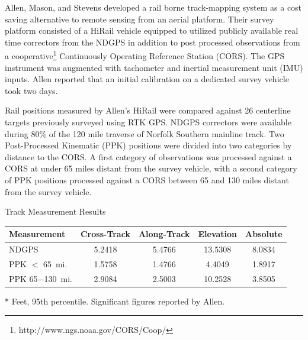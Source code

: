 Allen, Mason, and Stevens developed a rail borne track-mapping system as a cost saving alternative to remote sensing from an aerial platform. Their survey platform consisted of a HiRail vehicle equipped to utilized publicly available real time correctors from the NDGPS in addition to post processed observations from a cooperative\footnote{http://www.ngs.noaa.gov/CORS/Coop/} Continuously Operating Reference Station (CORS). The GPS instrument was augmented with tachometer and inertial measurement unit (IMU) inputs. Allen reported that an initial calibration on a dedicated survey vehicle took two days.

Rail positions measured by Allen's HiRail were compared against 26 centerline targets previously surveyed using RTK GPS. NDGPS correctors were available during 80\% of the 120 mile traverse of Norfolk Southern mainline track. Two Post-Processed Kinematic (PPK) positions were divided into two categories by distance to the CORS. A first category of observations was processed against a CORS at under 65 miles distant from the survey vehicle, with a second category of PPK positions processed against a CORS between 65 and 130 miles distant from the survey vehicle.

\begin{center}
\begin{threeparttable}
	\caption{Track Measurement Results~\citep{2006AllenAssetMap}}\label{tab:Allen}
		\begin{tabular}{ lcccc }
		\toprule
		Measurement &  Cross-Track\tnote{*} & Along-Track\tnote{*} & Elevation\tnote{*} & Absolute\tnote{*}\\
		\midrule
		NDGPS & 5.2418 & 5.4766 &13.5308 & 8.0834\\
		PPK $<$ 65~mi. & 1.5758 & 1.4766 &4.4049 & 1.8917\\
		PPK 65$-$130~mi.  & 2.9084 & 2.5003 &10.2528 & 3.8505\\
		\bottomrule
		\end{tabular}
		\begin{tablenotes}
		\item[*]{Feet, 95th percentile. Significant figures reported by Allen.}
		\end{tablenotes}
\end{threeparttable}
\end{center}

